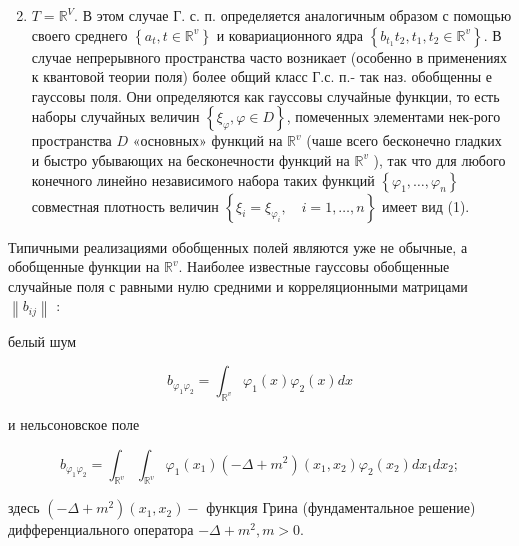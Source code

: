 \documentclass[10pt]{article}
\begin{document}
\begin{enumerate}

  \setcounter{enumi}{1}

  \item $T=\mathbb{R}^{V}$. В этом случае Г. с. п. определяется аналогичным образом с помощью своего среднего $\left\{a_{t}, t \in \mathbb{R}^{v}\right\}$ и ковариационного ядра $\left\{b_{t_{1}} t_{2}, t_{1}, t_{2} \in \mathbb{R}^{v}\right\}$. В случае непрерывного пространства часто возникает (особенно в применениях к квантовой теории поля) более общий класс Г.с. п.- так наз. обобщенны е гауссовы поля. Они определяются как гауссовы случайные функции, то есть наборы случайных величин $\left\{\xi_{\varphi}, \varphi \in D\right\}$, помеченных элементами нек-рого пространства $D$ «основных» функций на $\mathbb{R}^{v}$ (чаше всего бесконечно гладких и быстро убывающих на бесконечности функций на $\mathbb{R}^{v}$ ), так что для любого конечного линейно независимого набора таких функций $\left\{\varphi_{1}, \ldots, \varphi_{n}\right\}$ совместная плотность величин $\left\{\xi_{i}=\xi_{\varphi_{i}}, \quad i=1, \ldots, n\right\}$ имеет вид (1).

\end{enumerate}



Типичными реализациями обобщенных полей являются уже не обычные, а обобщенные функции на $\mathbb{R}^{v}$. Наиболее известные гауссовы обобщенные случайные поля с равными нулю средними и корреляционными матрицами $\left\|b_{i j}\right\|$ :



белый шум



\[

b_{\varphi_{1} \varphi_{2}}=\int_{\mathbb{R}^{v}} \varphi_{1}(x) \varphi_{2}(x) d x

\]



и нельсоновское поле



\[

b_{\varphi_{1} \varphi_{2}}=\int_{\mathbb{R}^{v}} \int_{\mathbb{R}^{v}} \varphi_{1}\left(x_{1}\right)\left(-\Delta+m^{2}\right)\left(x_{1}, x_{2}\right) \varphi_{2}\left(x_{2}\right) d x_{1} d x_{2} ;

\]



здесь $\left(-\Delta+m^{2}\right)\left(x_{1}, x_{2}\right)-$ функция Грина (фундаментальное решение) дифференциального оператора $-\Delta+m^{2}, m>0$.
\end{document}
